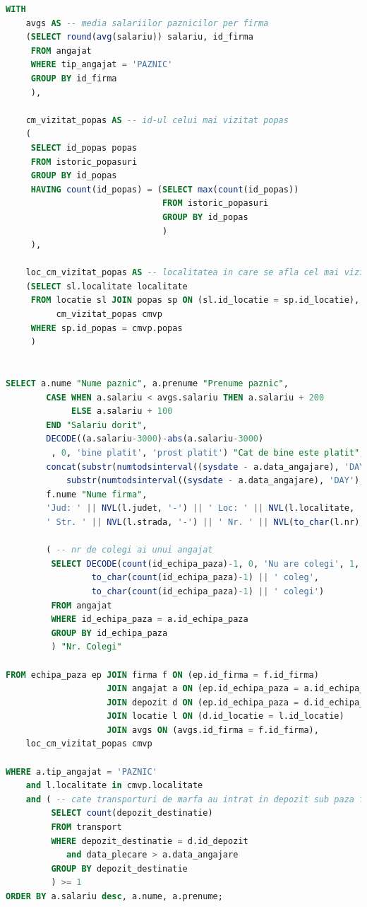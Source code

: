\documentclass[12pt, a4paper]{article}
\begin{document}
\begin{lstlisting}[language=SQL]
WITH
    avgs AS -- media salariilor paznicilor per firma
    (SELECT round(avg(salariu)) salariu, id_firma
     FROM angajat
     WHERE tip_angajat = 'PAZNIC'
     GROUP BY id_firma
     ),

    cm_vizitat_popas AS -- id-ul celui mai vizitat popas
    (
     SELECT id_popas popas
     FROM istoric_popasuri
     GROUP BY id_popas
     HAVING count(id_popas) = (SELECT max(count(id_popas))
                               FROM istoric_popasuri
                               GROUP BY id_popas
                               )
     ),

    loc_cm_vizitat_popas AS -- localitatea in care se afla cel mai vizitat popas
    (SELECT sl.localitate localitate
     FROM locatie sl JOIN popas sp ON (sl.id_locatie = sp.id_locatie),
          cm_vizitat_popas cmvp
     WHERE sp.id_popas = cmvp.popas
     )


SELECT a.nume "Nume paznic", a.prenume "Prenume paznic",
        CASE WHEN a.salariu < avgs.salariu THEN a.salariu + 200
             ELSE a.salariu + 100
        END "Salariu dorit",
        DECODE((a.salariu-3000)-abs(a.salariu-3000)
         , 0, 'bine platit', 'prost platit') "Cat de bine este platit",
        concat(substr(numtodsinterval((sysdate - a.data_angajare), 'DAY'), 8, 3) ||' zile ',
            substr(numtodsinterval((sysdate - a.data_angajare), 'DAY'), 12, 5)) "Vechime angajat",
        f.nume "Nume firma",
        'Jud: ' || NVL(l.judet, '-') || ' Loc: ' || NVL(l.localitate, '-') ||
        ' Str. ' || NVL(l.strada, '-') || ' Nr. ' || NVL(to_char(l.nr), '-') "Locatie depozit repartizat",

        ( -- nr de colegi ai unui angajat
         SELECT DECODE(count(id_echipa_paza)-1, 0, 'Nu are colegi', 1,
                 to_char(count(id_echipa_paza)-1) || ' coleg',
                 to_char(count(id_echipa_paza)-1) || ' colegi')
         FROM angajat
         WHERE id_echipa_paza = a.id_echipa_paza
         GROUP BY id_echipa_paza
         ) "Nr. Colegi"

FROM echipa_paza ep JOIN firma f ON (ep.id_firma = f.id_firma)
                    JOIN angajat a ON (ep.id_echipa_paza = a.id_echipa_paza)
                    JOIN depozit d ON (ep.id_echipa_paza = d.id_echipa_paza)
                    JOIN locatie l ON (d.id_locatie = l.id_locatie)
                    JOIN avgs ON (avgs.id_firma = f.id_firma),
    loc_cm_vizitat_popas cmvp

WHERE a.tip_angajat = 'PAZNIC'
    and l.localitate in cmvp.localitate
    and ( -- cate transporturi de marfa au intrat in depozit sub paza fiecarui angajat
         SELECT count(depozit_destinatie)
         FROM transport
         WHERE depozit_destinatie = d.id_depozit
            and data_plecare > a.data_angajare
         GROUP BY depozit_destinatie
         ) >= 1
ORDER BY a.salariu desc, a.nume, a.prenume;


\end{lstlisting}
\end{document}

